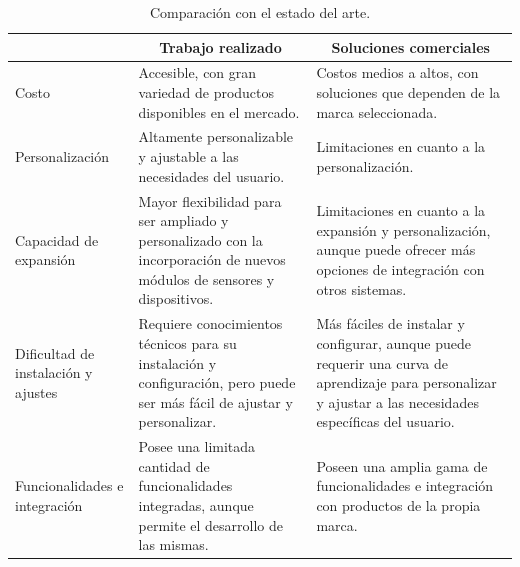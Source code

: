 \begin{table}[htbp]
    \centering
	\caption[Comparación con el estado del arte]{Comparación con el estado del arte.}
    \begin{tabular}{>{\raggedright}p{} p{} p{}}

        \toprule
		\multicolumn{1}{c}{\textbf{Característica}} &
  		\multicolumn{1}{c}{\textbf{Trabajo realizado}} &
  		\multicolumn{1}{c}{\textbf{Soluciones comerciales}} \\
        \midrule
    Costo           & Accesible, con gran variedad de productos disponibles en el mercado. & Costos medios a altos, con soluciones que dependen de la marca seleccionada. \\
    Personalización & Altamente personalizable y ajustable a las necesidades del usuario.  & Limitaciones en cuanto a la personalización.                                 \\
    Capacidad de expansión &   Mayor flexibilidad para ser ampliado y personalizado con la incorporación de nuevos módulos de sensores y dispositivos. &    Limitaciones en cuanto a la expansión y personalización, aunque puede ofrecer más opciones de integración con otros sistemas. \\
    Dificultad de instalación y ajustes & Requiere conocimientos técnicos para su instalación y configuración, pero puede ser más fácil de ajustar y personalizar. & Más fáciles de instalar y configurar, aunque puede requerir una curva de aprendizaje para personalizar y ajustar a las necesidades específicas del usuario. \\
    Funcionalidades e integración & Posee una limitada cantidad de funcionalidades integradas, aunque permite el desarrollo de las mismas. & Poseen una amplia gama de funcionalidades e integración con productos de la propia marca. \\ 
    \bottomrule
    \hline
    \end{tabular}
    \label{tab:comp_arte}
\end{table}
